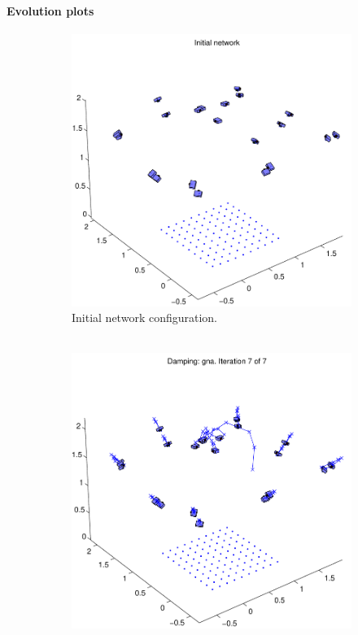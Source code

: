 \documentclass{article}
\begin{document}
\paragraph{Evolution plots}

\begin{figure}
  \centering
  \begin{subfigure}[b]{0.49\textwidth}
    \includegraphics[width=\textwidth]{ill/ccamx0}
    \caption{Initial network configuration.\\~}
    \label{fig:camx0}
  \end{subfigure}%
  \begin{subfigure}[b]{0.49\textwidth}
    \includegraphics[width=\textwidth]{ill/ccamxfinal}

\end{subfigure}
\end{figure}
\end{document}
